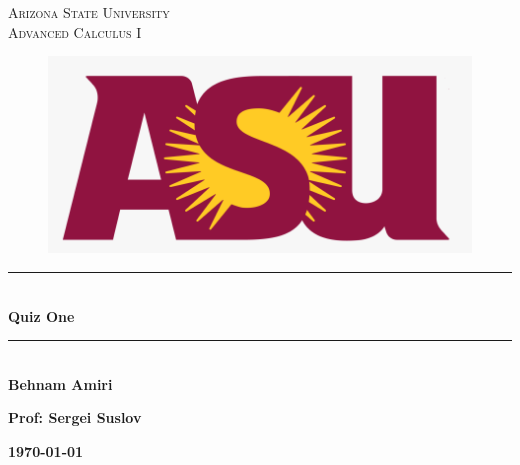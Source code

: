 \documentclass[fleqn]{article}
\begin{document}
  \begin{titlepage}

    \newcommand{\HRule}{\rule{\linewidth}{0.5mm}}

    \center


    \textsc{\LARGE Arizona State University}\\[1.5cm]

    \textsc{\LARGE Advanced Calculus I }\\[1.5cm]


    \begin{figure}
      \includegraphics[width=\linewidth]{asu.png}
    \end{figure}


    \HRule \\[0.4cm]
    { \huge \bfseries Quiz One }\\[0.4cm] 
    \HRule \\[1.5cm]

    \textbf{Behnam Amiri}

    \bigbreak

    \textbf{Prof: Sergei Suslov}

    \bigbreak


    \textbf{{\large \today}\\[2cm]}

    \vfill

  \end{titlepage}
\end{document}
